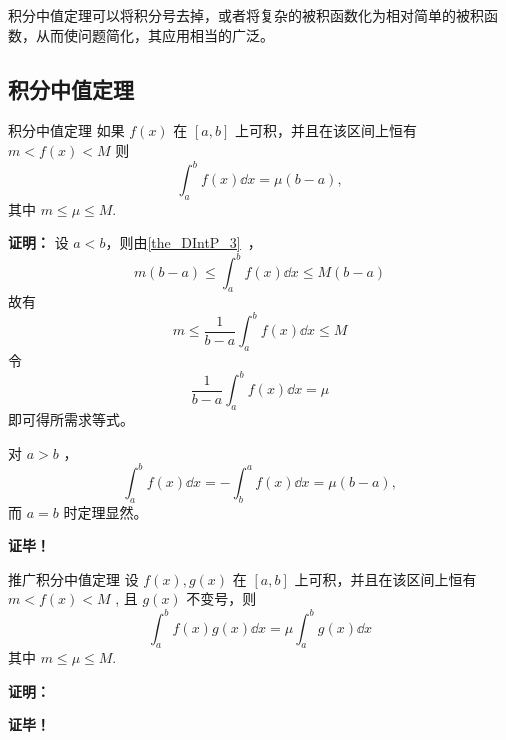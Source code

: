 
\begin{issues}
\issueDraft
\end{issues}

积分中值定理可以将积分号去掉，或者将复杂的被积函数化为相对简单的被积函数，从而使问题简化，其应用相当的广泛。

\subsection{积分中值定理}
\begin{theorem}{积分中值定理}
如果 $f(x)$ 在 $[a,b]$ 上可积，并且在该区间上恒有$m<f(x)<M$
则
\begin{equation}
\int_a^b f(x)\dd x=\mu(b-a),
\end{equation}
其中 $m\leq\mu\leq M.$
\end{theorem}

\textbf{证明：}
设 $a<b$，则由\autoref{the_DIntP_3}~，
\begin{equation}
m(b-a)\leq\int_a^b f(x)\dd x\leq M(b-a)
\end{equation}
故有
\begin{equation}
m\leq\frac{1}{b-a}\int_a^b f(x)\dd x\leq M
\end{equation}
令
\begin{equation}
\frac{1}{b-a}\int_a^b f(x)\dd x=\mu
\end{equation}
即可得所需求等式。

对 $a>b$ ，
\begin{equation}
\int_a^b f(x)\dd x=-\int_b^a f(x)\dd x=\mu(b-a),
\end{equation}
而 $a=b$ 时定理显然。 

\textbf{证毕！}

\begin{theorem}{推广积分中值定理}
设 $f(x),g(x)$ 在 $[a,b]$ 上可积，并且在该区间上恒有$m<f(x)<M$
, 且 $g(x)$ 不变号，则
\begin{equation}
\int_a^b f(x)g(x)\dd x=\mu\int_a^b g(x)\dd x
\end{equation}
其中 $m\leq\mu\leq M.$
\end{theorem}
\textbf{证明：}


\textbf{证毕！}